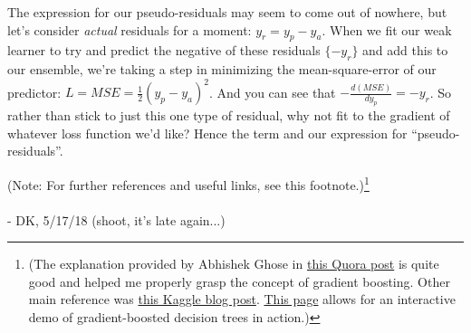 \documentclass[../main/main.tex]{subfiles}
\begin{document}
The expression for our pseudo-residuals may seem to come out of nowhere, but let's
consider \emph{actual} residuals for a moment: \(y_r = y_p - y_a\). When we fit
our weak learner to try and predict the negative of these residuals \(\{-y_r\}\) 
and add this to our ensemble, 
we're taking a step in minimizing the mean-square-error
of our predictor: \(L = MSE = \frac{1}{2} \left(y_p - y_a\right)^2\). And you can see that
\(- \frac{d(MSE)}{dy_p} = -y_r\). So rather than stick to just this one type of residual,
why not fit to the gradient of whatever loss function we'd like? 
Hence the term and our expression for ``pseudo-residuals''.

(Note: For further references and useful links, see this footnote.)\footnote{
(The explanation provided by Abhishek Ghose in \href{https://www.quora.com/What-is-an-intuitive-explanation-of-Gradient-Boosting}
{this Quora post} is quite good and helped me properly grasp
the concept of gradient boosting. Other main reference was
\href{http://blog.kaggle.com/2017/01/23/a-kaggle-master-explains-gradient-boosting/}
{this Kaggle blog post}. \href{http://arogozhnikov.github.io/2016/07/05/gradient_boosting_playground.html}
{This page} allows for an interactive demo of gradient-boosted decision trees in action.)
}
\\
\\
- DK, 5/17/18 (shoot, it's late again...)
\end{document}
